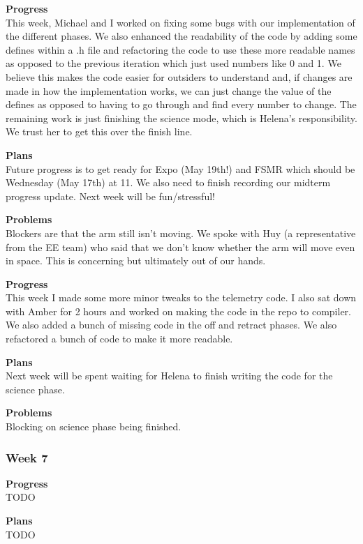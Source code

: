 \textbf{Progress} \\ 
This week, Michael and I worked on fixing some bugs with our implementation of the different phases. We also enhanced the readability of the code by 
adding some defines within a .h file and refactoring the code to use these more readable names as opposed to the previous iteration which just used 
numbers like 0 and 1. We believe this makes the code easier for outsiders to understand and, if changes are made in how the implementation works, we can 
just change the value of the defines as opposed to having to go through and find every number to change. The remaining work is just finishing the science 
mode, which is Helena's responsibility. We trust her to get this over the finish line.

\textbf{Plans} \\ 
Future progress is to get ready for Expo (May 19th!) and FSMR which should be Wednesday (May 17th) at 11. We also need to finish recording our midterm 
progress update. Next week will be fun/stressful!

\textbf{Problems} \\ 
Blockers are that the arm still isn't moving. We spoke with Huy (a representative from the EE team) who said that we don't know whether the arm will move 
even in space. This is concerning but ultimately out of our hands.

\textbf{Progress} \\
This week I made some more minor tweaks to the telemetry code. I also sat down with Amber for 2 hours and worked on making the code in the repo to compiler. We also added a bunch of missing code in the off and retract phases. We also refactored a bunch of code to make it more readable.

\textbf{Plans} \\
Next week will be spent waiting for Helena to finish writing the code for the science phase.

\textbf{Problems} \\
Blocking on science phase being finished.

\subsubsection{Week 7}
\textbf{Progress} \\ 
TODO

\textbf{Plans} \\ 
TODO

